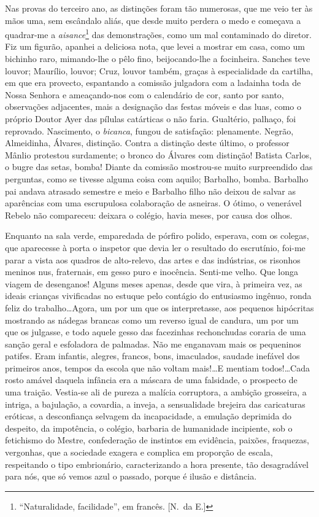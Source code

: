 Nas provas do terceiro ano, as distinções foram
tão numerosas, que me veio ter às mãos uma, sem escândalo aliás, que
desde muito perdera o medo e começava a quadrar{}-me a \textit{aisance}\footnote{ ``Naturalidade, 
facilidade'', em francês. [N.~da E.]} das
demonstrações, como um mal contaminado do diretor. Fiz um figurão,
apanhei a deliciosa nota, que levei a mostrar em casa, como um bichinho
raro, mimando{}-lhe o pêlo fino, beijocando{}-lhe a focinheira. Sanches
teve louvor; Maurílio, louvor; Cruz, louvor também, graças à
especialidade da cartilha, em que era provecto, espantando a comissão
julgadora com a ladainha toda de Nossa Senhora e ameaçando{}-nos com o
calendário de cor, santo por santo, observações adjacentes, mais a
designação das festas móveis e das luas, como o próprio Doutor Ayer das
pílulas catárticas o não faria. Gualtério, palhaço, foi reprovado.
Nascimento, o \textit{bicanca}, fungou de satisfação: plenamente. Negrão,
Almeidinha, Álvares, distinção. Contra a distinção deste último, o
professor Mânlio protestou surdamente; o bronco do Álvares com
distinção! Batista Carlos, o bugre das setas, bomba! Diante da comissão
mostrou{}-se muito surpreendido das perguntas, como se tivesse alguma
coisa com aquilo; Barbalho, bomba. Barbalho pai andava atrasado
semestre e meio e Barbalho filho não deixou de salvar as aparências com
uma escrupulosa colaboração de asneiras. O ótimo, o venerável Rebelo
não compareceu: deixara o colégio, havia meses, por causa dos olhos.

Enquanto na sala verde, emparedada de pórfiro polido, esperava, com os
colegas, que aparecesse à porta o inspetor que devia ler o resultado do
escrutínio, foi{}-me parar a vista aos quadros de alto{}-relevo, das artes
e das indústrias, os risonhos meninos nus, fraternais, em gesso puro e
inocência. Senti{}-me velho. Que longa viagem de desenganos! Alguns
meses apenas, desde que vira, à primeira vez, as ideais crianças
vivificadas no estuque pelo contágio do entusiasmo ingênuo, ronda feliz
do trabalho\ldots Agora, um por um que os interpretasse, aos pequenos
hipócritas mostrando as nádegas brancas como um reverso igual de
candura, um por um que os julgasse, e todo aquele gesso das facezinhas
rechonchudas coraria de uma sanção geral e esfoladora de palmadas. Não
me enganavam mais os pequeninos patifes. Eram infantis, alegres,
francos, bons, imaculados, saudade inefável dos primeiros anos, tempos
da escola que não voltam mais!\ldots E mentiam todos!\ldots Cada rosto amável
daquela infância era a máscara de uma falsidade, o prospecto de uma
traição. Vestia{}-se ali de pureza a malícia corruptora, a ambição
grosseira, a intriga, a bajulação, a covardia, a inveja, a sensualidade
brejeira das caricaturas eróticas, a desconfiança selvagem da
incapacidade, a emulação deprimida do despeito, da impotência, o
colégio, barbaria de humanidade incipiente, sob o fetichismo do Mestre,
confederação de instintos em evidência, paixões, fraquezas, vergonhas,
que a sociedade exagera e complica em proporção de escala, respeitando
o tipo embrionário, caracterizando a hora presente, tão desagradável
para nós, que só vemos azul o passado, porque é ilusão e distância.

